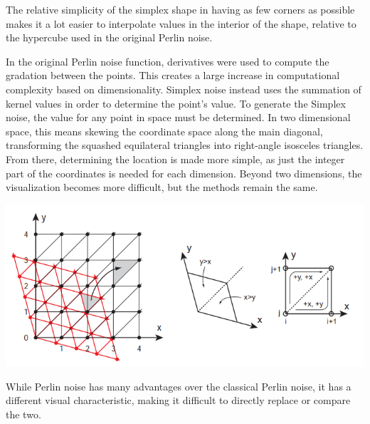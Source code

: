 \documentclass[10pt]{report}
\begin{document}
		The relative simplicity of the simplex shape in having as few corners as possible makes it a lot easier to interpolate values in the interior of the shape, relative to the hypercube used in the original Perlin noise.
		
		In the original Perlin noise function, derivatives were used to compute the gradation between the points. This creates a large increase in computational complexity based on dimensionality. Simplex noise instead uses the summation of kernel values in order to determine the point's value. To generate the Simplex noise, the value for any point in space must be determined. In two dimensional space, this means skewing the coordinate space along the main diagonal, transforming the squashed equilateral triangles into right-angle isosceles triangles. From there, determining the location is made more simple, as just the integer part of the coordinates is needed for each dimension. Beyond two dimensions, the visualization becomes more difficult, but the methods remain the same.  
		
		\begin{minipage}{\textwidth}
			\centering
			\includegraphics[scale=.5]{skewed grid}
			\label{fig:fig3}
		\end{minipage}
		
		While Perlin noise has many advantages over the classical Perlin noise, it has a different visual characteristic, making it difficult to directly replace or compare the two. 
		
\end{document}
